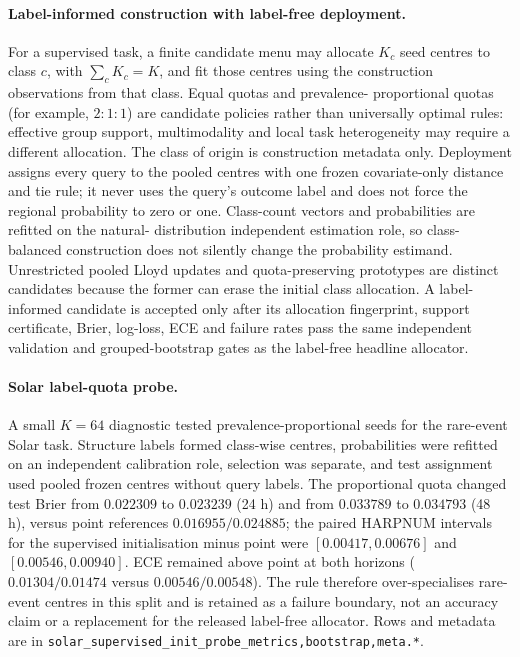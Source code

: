 \documentclass[11pt,a4paper]{article}
\numberwithin{equation}{section}
\theoremstyle{definition}\newtheorem{definition}[theorem]{Definition}
\theoremstyle{remark}\newtheorem{remark}[theorem]{Remark}
\begin{document}
\paragraph{Label-informed construction with label-free deployment.}
For a supervised task, a finite candidate menu may allocate $K_c$ seed
centres to class $c$, with $\sum_cK_c=K$, and fit those centres using the
construction observations from that class. Equal quotas and prevalence-
proportional quotas (for example, $2{:}1{:}1$) are candidate policies rather
than universally optimal rules: effective group support, multimodality and
local task heterogeneity may require a different allocation. The class of
origin is construction metadata only. Deployment assigns every query to the
pooled centres with one frozen covariate-only distance and tie rule; it never
uses the query's outcome label and does not force the regional probability to
zero or one. Class-count vectors and probabilities are refitted on the natural-
distribution independent estimation role, so class-balanced construction does
not silently change the probability estimand. Unrestricted pooled Lloyd
updates and quota-preserving prototypes are distinct candidates because the
former can erase the initial class allocation. A label-informed candidate is
accepted only after its allocation fingerprint, support certificate, Brier,
log-loss, ECE and failure rates pass the same independent validation and
grouped-bootstrap gates as the label-free headline allocator.

\paragraph{Solar label-quota probe.}
A small $K=64$ diagnostic tested prevalence-proportional seeds for the rare-event
Solar task. Structure labels formed class-wise centres, probabilities were
refitted on an independent calibration role, selection was separate, and test
assignment used pooled frozen centres without query labels. The proportional
quota changed test Brier from $0.022309$ to $0.023239$ (24 h) and from
$0.033789$ to $0.034793$ (48 h), versus point references $0.016955/0.024885$;
the paired HARPNUM intervals for the supervised initialisation minus point were
$[0.00417,0.00676]$ and $[0.00546,0.00940]$. ECE remained above point at both
horizons ($0.01304/0.01474$ versus $0.00546/0.00548$). The rule therefore
over-specialises rare-event centres in this split and is retained as a failure
boundary, not an accuracy claim or a replacement for the released label-free
allocator. Rows and metadata are in
\texttt{solar\_supervised\_init\_probe\_{metrics,bootstrap,meta}.*}.
\end{document}
